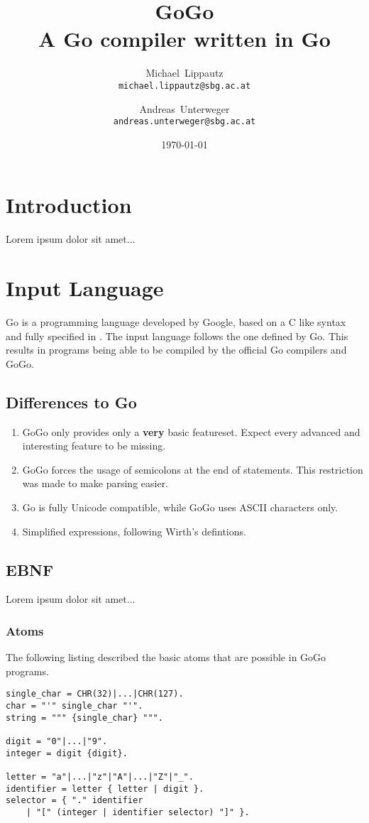 \documentclass[a4paper]{scrreprt}
\title{GoGo\\ \large{A Go compiler written in Go}}
\author{
  Michael~Lippautz \\ \normalsize{\texttt{michael.lippautz@sbg.ac.at}} 
    \and 
  Andreas~Unterweger \\ \normalsize{\texttt{andreas.unterweger@sbg.ac.at}} 
}
\date{\today}
\begin{document}
  \maketitle
  \tableofcontents

  \chapter{Introduction}
    Lorem ipsum dolor sit amet...

  \chapter{Input Language}
    Go is a programming language developed by Google, based on a C like syntax and fully specified in \cite{goo10}. The input language follows the one defined by Go. This results in programs being able to be compiled by the official Go compilers and GoGo.

    \section{Differences to Go}
      \begin{enumerate}
        \item GoGo only provides only a \textbf{very} basic featureset. Expect every advanced and interesting feature to be missing.
        \item GoGo forces the usage of semicolons at the end of statements. This restriction was made to make parsing easier.
        \item Go is fully Unicode compatible, while GoGo uses ASCII characters only.
        \item Simplified expressions, following Wirth's \cite{wir96} defintions.
      \end{enumerate}

    \section{EBNF}
      Lorem ipsum dolor sit amet...

      \subsection*{Atoms}
        The following listing described the basic atoms that are possible in GoGo programs.

        \begin{lstlisting}[caption=Atoms]
single_char = CHR(32)|...|CHR(127).
char = "'" single_char "'".
string = """ {single_char} """.

digit = "0"|...|"9".	
integer = digit {digit}.

letter = "a"|...|"z"|"A"|...|"Z"|"_".
identifier = letter { letter | digit }.
selector = { "." identifier 
    | "[" (integer | identifier selector) "]" }.
        \end{lstlisting}
\end{document}
